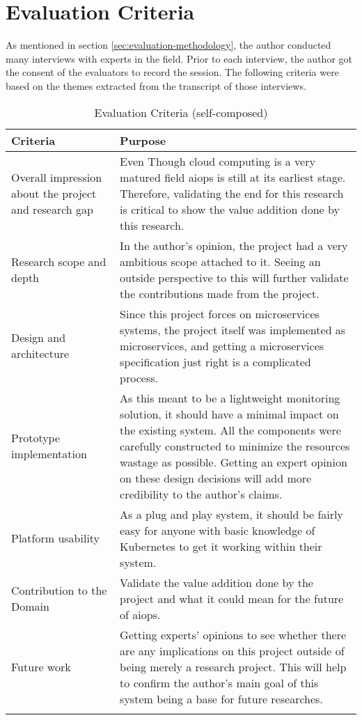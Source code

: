 \section{Evaluation Criteria}

As mentioned in section \ref{sec:evaluation-methodology}, the author conducted many interviews with experts in the field. Prior to each interview, the author got the consent of the evaluators to record the session. The following criteria were based on the themes extracted from the transcript of those interviews.

\begin{longtable}{|p{33mm}|p{120mm}|}
    \hline
    \textbf{Criteria} &
    \textbf{Purpose} \\ \hline
    Overall impression about the project and research gap &
        Even Though cloud computing is a very matured field \ac{aiops} is still at its earliest stage. Therefore, validating the end for this research is critical to show the value addition done by this research. \\ \hline
    Research scope and depth &
        In the author's opinion, the project had a very ambitious scope attached to it. Seeing an outside perspective to this will further validate the contributions made from the project. \\ \hline
    Design and architecture &
        Since this project forces on microservices systems, the project itself was implemented as microservices, and getting a microservices specification just right is a complicated process. \\ \hline
    Prototype implementation &
        As this meant to be a lightweight monitoring solution, it should have a minimal impact on the existing system. All the components were carefully constructed to minimize the resources wastage as possible. Getting an expert opinion on these design decisions will add more credibility to the author's claims. \\ \hline
    Platform usability &
        As a plug and play system, it should be fairly easy for anyone with basic knowledge of Kubernetes to get it working within their system. \\ \hline
    Contribution to the Domain &
        Validate the value addition done by the project and what it could mean for the future of \ac{aiops}. \\ \hline
    Future work &
        Getting experts' opinions to see whether there are any implications on this project outside of being merely a research project. This will help to confirm the author’s main goal of this system being a base for future researches. \\ \hline
  
    \caption{Evaluation Criteria (self-composed)}
\end{longtable}